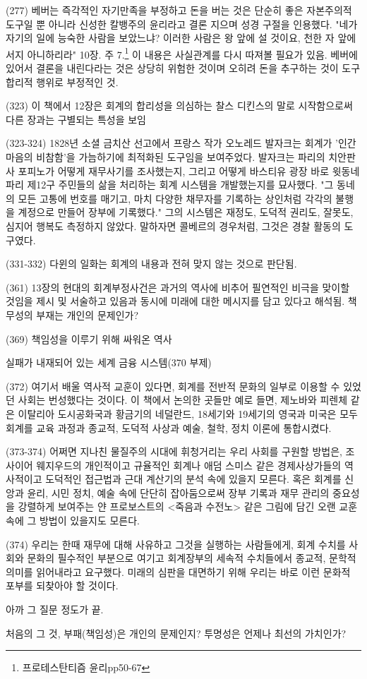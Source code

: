 \documentclass[12pt, a4paper]{article}
\begin{document}
(277) 베버는 즉각적인 자기만족을 부정하고 돈을 버는 것은 단순히 좋은 자본주의적 도구일 뿐 아니라 신성한 칼뱅주의 윤리라고 결론 지으며 성경 구절을 인용했다. "네가 자기의 일에 능숙한 사람을 보았느냐? 이러한 사람은 왕 앞에 설 것이요, 천한 자 앞에 서지 아니하리라" 10장. 주 7.\footnote{프로테스탄티즘 윤리pp50-67} 이 내용은 사실관계를 다시 따져볼 필요가 있음. 베버에 있어서 결론을 내린다라는 것은 상당히 위험한 것이며 오히려 돈을 추구하는 것이 도구합리적 행위로 부정적인 것.

(323) 이 책에서 12장은 회계의 합리성을 의심하는 찰스 디킨스의 말로 시작함으로써 다른 장과는 구별되는 특성을 보임

(323-324) 1828년 소셜 금치산 선고에서 프랑스 작가 오노레드 발자크는 회계가 '인간 마음의 비참함'을 가늠하기에 최적화된 도구임을 보여주었다. 발자크는 파리의 치안판사 포피노가 어떻게 재무사기를 조사했는지, 그리고 어떻게 바스티유 광장 바로 윗동네 파리 제12구 주민들의 삶을 처리하는 회계 시스템을 개발했는지를 묘사했다. "그 동네의 모든 고통에 번호를 매기고, 마치 다양한 채무자를 기록하는 상인처럼 각각의 불행을 계정으로 만들어 장부에 기록했다." 그의 시스템은 재정도, 도덕적 권리도, 잘못도, 심지어 행복도 측정하지 않았다. 말하자면 콜베르의 경우처럼, 그것은 경찰 활동의 도구였다.

(331-332) 다윈의 일화는 회계의 내용과 전혀 맞지 않는 것으로 판단됨.

(361) 13장의 현대의 회계부정사건은 과거의 역사에 비추어 필연적인 비극을 맞이할 것임을 제시 및 서술하고 있음과 동시에 미래에 대한 메시지를 담고 있다고 해석됨. 책무성의 부재는 개인의 문제인가? 

(369) 책임성을 이루기 위해 싸워온 역사

실패가 내재되어 있는 세계 금융 시스템(370 부제)

(372) 여기서 배울 역사적 교훈이 있다면, 회계를 전반적 문화의 일부로 이용할 수 있었던 사회는 번성했다는 것이다. 이 책에서 논의한 곳들만 예로 들면, 제노바와 피렌체 같은 이탈리아 도시공화국과 황금기의 네덜란드, 18세기와 19세기의 영국과 미국은 모두 회계를 교육 과정과 종교적, 도덕적 사상과 예술, 철학, 정치 이론에 통합시켰다.

(373-374) 어쩌면 지나친 물질주의 시대에 휘청거리는 우리 사회를 구원할 방법은, 조사이어 웨지우드의 개인적이고 규율적인 회계나 애덤 스미스 같은 경제사상가들의 역사적이고 도덕적인 접근법과 근대 계산기의 분석 속에 있을지 모른다. 혹은 회계를 신앙과 윤리, 시민 정치, 예술 속에 단단히 잡아둠으로써 장부 기록과 재무 관리의 중요성을 강렬하게 보여주는 얀 프로보스트의 <죽음과 수전노> 같은 그림에 담긴 오랜 교훈 속에 그 방법이 있을지도 모른다.

(374) 우리는 한때 재무에 대해 사유하고 그것을 실행하는 사람들에게, 회계 수치를 사회와 문화의 필수적인 부분으로 여기고 회계장부의 세속적 수치들에서 종교적, 문학적 의미를 읽어내라고 요구했다. 미래의 심판을 대면하기 위해 우리는 바로 이런 문화적 포부를 되찾아야 할 것이다.

아까 그 질문 정도가 끝.

처음의 그 것, 부패(책임성)은 개인의 문제인지? 투명성은 언제나 최선의 가치인가?
\end{document}
